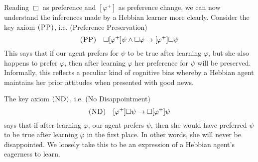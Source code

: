 \documentclass[12pt]{article}
\theoremstyle{definition}
\newcommand{\axiom}{\textsc}
\begin{document}


Reading $\Box$ as preference and $[\varphi^+]$ as preference change, we can now understand the inferences made by a Hebbian learner more clearly.  Consider the key axiom $\axiom{(PP)}$, i.e. (Preference Preservation)
\[
\axiom{(PP)} \quad \Box [\varphi^+] \psi \land \Box \varphi \to [\varphi^+] \Box \psi
\]
This says that if our agent prefers for $\psi$ to be true after learning $\varphi$, but she also happens to prefer $\varphi$, then after learning $\varphi$ her preference for $\psi$ will be preserved.  Informally, this reflects a peculiar kind of cognitive bias whereby a Hebbian agent maintains her prior attitudes when presented with good news.

The key axiom $\axiom{(ND)}$, i.e. (No Disappointment)
\[
\axiom{(ND)} \quad [\varphi^+] \Box \psi \to \Box [\varphi^+] \psi
\]
says that if after learning $\varphi$, our agent prefers $\psi$, then she would have preferred $\psi$ to be true after learning $\varphi$ in the first place.  In other words, she will never be disappointed.  We loosely take this to be an expression of a Hebbian agent's eagerness to learn.
\end{document}
